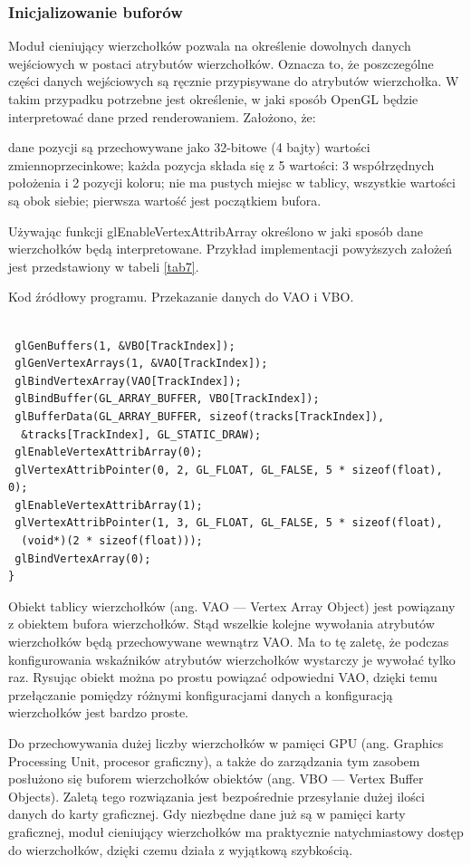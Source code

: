 \subsubsection{Inicjalizowanie buforów}
Moduł cieniujący wierzchołków pozwala na określenie dowolnych danych wejściowych w postaci atrybutów wierzchołków. Oznacza to, że poszczególne części danych wejściowych są ręcznie przypisywane do atrybutów wierzchołka. W takim przypadku potrzebne jest określenie, w jaki sposób OpenGL będzie interpretować dane przed renderowaniem. Założono, że:
\begin{itemize}
\itemi dane pozycji są przechowywane jako 32-bitowe (4 bajty) wartości zmiennoprzecinkowe;
\itemi każda pozycja składa się z 5 wartości: 3 współrzędnych położenia i 2 pozycji koloru;
\itemi nie ma pustych miejsc w tablicy, wszystkie wartości są obok siebie;
\itemi pierwsza wartość jest początkiem bufora.
\end{itemize}
Używając funkcji glEnableVertexAttribArray określono w jaki sposób dane wierzchołków będą interpretowane. Przykład implementacji powyższych założeń jest przedstawiony w tabeli \ref{tab7}.
\begin{table}[H]
\caption{Kod źródłowy programu. Przekazanie danych do VAO i VBO.}
\label{tab7}
\begin{lstlisting}[frame=single]  % Start your code-block

 glGenBuffers(1, &VBO[TrackIndex]);
 glGenVertexArrays(1, &VAO[TrackIndex]);
 glBindVertexArray(VAO[TrackIndex]);
 glBindBuffer(GL_ARRAY_BUFFER, VBO[TrackIndex]);
 glBufferData(GL_ARRAY_BUFFER, sizeof(tracks[TrackIndex]), 
  &tracks[TrackIndex], GL_STATIC_DRAW);
 glEnableVertexAttribArray(0);
 glVertexAttribPointer(0, 2, GL_FLOAT, GL_FALSE, 5 * sizeof(float), 0);
 glEnableVertexAttribArray(1);
 glVertexAttribPointer(1, 3, GL_FLOAT, GL_FALSE, 5 * sizeof(float), 
  (void*)(2 * sizeof(float)));
 glBindVertexArray(0);
}
\end{lstlisting}
\end{table}
Obiekt tablicy wierzchołków (ang. VAO --- Vertex Array Object) jest powiązany z obiektem bufora wierzchołków. Stąd wszelkie kolejne wywołania atrybutów wierzchołków będą przechowywane wewnątrz VAO. Ma to tę zaletę, że podczas konfigurowania wskaźników atrybutów wierzchołków wystarczy je wywołać tylko raz. Rysując obiekt można po prostu powiązać odpowiedni VAO, dzięki temu przełączanie pomiędzy różnymi konfiguracjami danych a konfiguracją wierzchołków jest bardzo proste.

Do przechowywania dużej liczby wierzchołków w pamięci GPU (ang. Graphics Processing Unit, procesor graficzny), a także do zarządzania tym zasobem posłużono się buforem wierzchołków obiektów (ang. VBO --- Vertex Buffer Objects). Zaletą tego rozwiązania jest bezpośrednie przesyłanie dużej ilości danych do karty graficznej. Gdy niezbędne dane już są w pamięci karty graficznej, moduł cieniujący wierzchołków ma praktycznie natychmiastowy dostęp do wierzchołków, dzięki czemu działa z wyjątkową szybkością.

